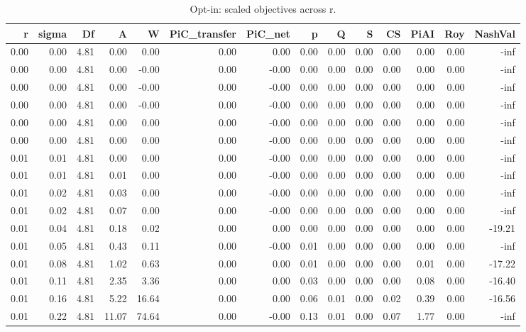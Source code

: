 \begin{table}[!ht]
\centering
\caption{Opt-in: scaled objectives across r.}
\label{tab:optin_objectives}
\begin{tabular}{rrrrrrrrrrrrrr}
\toprule
r & sigma & Df & A & W & PiC_transfer & PiC_net & p & Q & S & CS & PiAI & Roy & NashVal \\
\midrule
0.00 & 0.00 & 4.81 & 0.00 & 0.00 & 0.00 & 0.00 & 0.00 & 0.00 & 0.00 & 0.00 & 0.00 & 0.00 & -inf \\
0.00 & 0.00 & 4.81 & 0.00 & -0.00 & 0.00 & -0.00 & 0.00 & 0.00 & 0.00 & 0.00 & 0.00 & 0.00 & -inf \\
0.00 & 0.00 & 4.81 & 0.00 & -0.00 & 0.00 & -0.00 & 0.00 & 0.00 & 0.00 & 0.00 & 0.00 & 0.00 & -inf \\
0.00 & 0.00 & 4.81 & 0.00 & -0.00 & 0.00 & -0.00 & 0.00 & 0.00 & 0.00 & 0.00 & 0.00 & 0.00 & -inf \\
0.00 & 0.00 & 4.81 & 0.00 & 0.00 & 0.00 & -0.00 & 0.00 & 0.00 & 0.00 & 0.00 & 0.00 & 0.00 & -inf \\
0.00 & 0.00 & 4.81 & 0.00 & 0.00 & 0.00 & -0.00 & 0.00 & 0.00 & 0.00 & 0.00 & 0.00 & 0.00 & -inf \\
0.01 & 0.01 & 4.81 & 0.00 & 0.00 & 0.00 & -0.00 & 0.00 & 0.00 & 0.00 & 0.00 & 0.00 & 0.00 & -inf \\
0.01 & 0.01 & 4.81 & 0.01 & 0.00 & 0.00 & -0.00 & 0.00 & 0.00 & 0.00 & 0.00 & 0.00 & 0.00 & -inf \\
0.01 & 0.02 & 4.81 & 0.03 & 0.00 & 0.00 & -0.00 & 0.00 & 0.00 & 0.00 & 0.00 & 0.00 & 0.00 & -inf \\
0.01 & 0.02 & 4.81 & 0.07 & 0.00 & 0.00 & -0.00 & 0.00 & 0.00 & 0.00 & 0.00 & 0.00 & 0.00 & -inf \\
0.01 & 0.04 & 4.81 & 0.18 & 0.02 & 0.00 & 0.00 & 0.00 & 0.00 & 0.00 & 0.00 & 0.00 & 0.00 & -19.21 \\
0.01 & 0.05 & 4.81 & 0.43 & 0.11 & 0.00 & -0.00 & 0.01 & 0.00 & 0.00 & 0.00 & 0.00 & 0.00 & -inf \\
0.01 & 0.08 & 4.81 & 1.02 & 0.63 & 0.00 & 0.00 & 0.01 & 0.00 & 0.00 & 0.00 & 0.01 & 0.00 & -17.22 \\
0.01 & 0.11 & 4.81 & 2.35 & 3.36 & 0.00 & 0.00 & 0.03 & 0.00 & 0.00 & 0.00 & 0.08 & 0.00 & -16.40 \\
0.01 & 0.16 & 4.81 & 5.22 & 16.64 & 0.00 & 0.00 & 0.06 & 0.01 & 0.00 & 0.02 & 0.39 & 0.00 & -16.56 \\
0.01 & 0.22 & 4.81 & 11.07 & 74.64 & 0.00 & -0.00 & 0.13 & 0.01 & 0.00 & 0.07 & 1.77 & 0.00 & -inf \\

\end{tabular}
\end{table}
